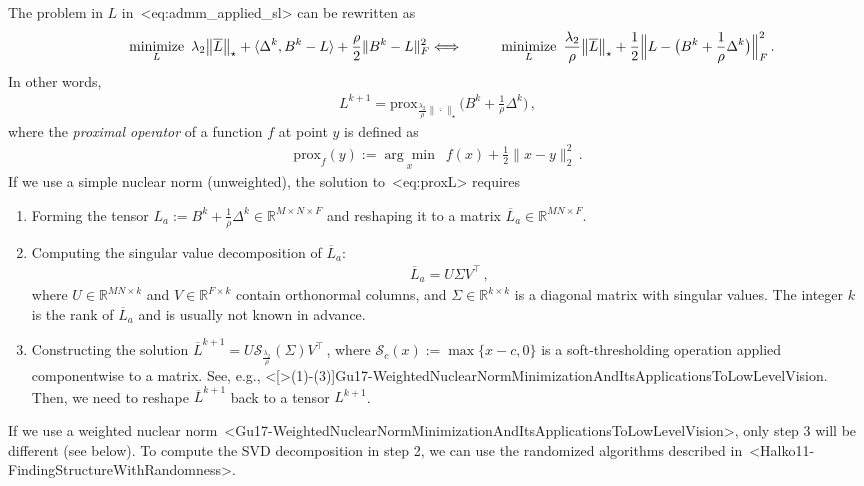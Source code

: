\documentclass[a4paper,11pt]{article}
\def\\{}%
\def\cite#1{<#1>}%
\def\eqref#1{<#1>}%
\newcommand{\mypar}[1]{\bigskip\noindent {\bf #1.}}
\begin{document}
\mypar{Updating $\bm{L}$}
The problem in $L$ in~\eqref{eq:admm_applied_sl} can be rewritten as
\begin{align}
  &\qquad
  \underset{L}{\text{minimize}} \,\,\,
  \lambda_2 \big\|\overline{L}\big\|_{\star}
  +
  \langle\Delta^k,B^k - L\rangle
  +
  \frac{\rho}{2}
  \|B^k - L\|_{F}^2
  \notag
  \\
  \Longleftrightarrow
  &\qquad
  \underset{L}{\text{minimize}} \,\,\,
  \frac{\lambda_2}{\rho} \big\|\overline{L}\big\|_{\star}
  +
  \frac{1}{2}
  \Big\|L - \big(B^k + \frac{1}{\rho} \Delta^k\big)\Big\|_F^2\,.
  \label{eq:probL1}
\end{align}
In other words, 
\begin{align}
  \label{eq:proxL}
  L^{k+1} =
  \text{prox}_{\frac{\lambda_2}{\rho}\|\overline{\cdot}\|_{\star}}\Big(B^k +
  \frac{1}{\rho}\Delta^k\Big)\,,
\end{align}
where the \textit{proximal operator} of a function $f$ at point $y$ is
defined as
\begin{align*}
  \text{prox}_f(y)
  :=
  \underset{x}{\arg\min}\,\,\, f(x) + \frac{1}{2}\|x - y\|_2^2\,.
\end{align*}
If we use a simple nuclear norm (unweighted), the solution to~\eqref{eq:proxL}
requires
\begin{enumerate}
  \item Forming the tensor $L_a := B^k + \frac{1}{\rho}\Delta^k \in
    \mathbb{R}^{M\times N\times F}$ and reshaping it to a matrix
    $\overline{L}_a \in \mathbb{R}^{MN \times F}$.

  \item Computing the singular value decomposition of $\overline{L}_a$:
    \begin{align*}
      \overline{L}_a = U \Sigma V^\top\,,
    \end{align*}
    where $U \in \mathbb{R}^{MN \times k}$ and $V \in \mathbb{R}^{F \times k}$
    contain orthonormal columns, and $\Sigma \in \mathbb{R}^{k \times k}$ is a
    diagonal matrix with singular values. The integer $k$ is the rank of
    $\overline{L}_a$ and is usually not known in advance.

  \item Constructing the solution $\overline{L}^{k+1} = U
    \mathcal{S}_{\frac{\lambda_2}{\rho}}(\Sigma)V^\top$\,, where
    $\mathcal{S}_{c}(x) := \max\{x - c, 0\}$ is a soft-thresholding operation
    applied componentwise to a matrix. See, e.g.,
    \cite[(1)-(3)]{Gu17-WeightedNuclearNormMinimizationAndItsApplicationsToLowLevelVision}.
    Then, we need to reshape $\overline{L}^{k+1}$ back to a tensor $L^{k+1}$.
\end{enumerate}
If we use a weighted nuclear
norm~\cite{Gu17-WeightedNuclearNormMinimizationAndItsApplicationsToLowLevelVision},
only step 3 will be different (see below). To compute the SVD decomposition in
step 2, we can use the randomized algorithms described
in~\cite{Halko11-FindingStructureWithRandomness}.
\end{document}
